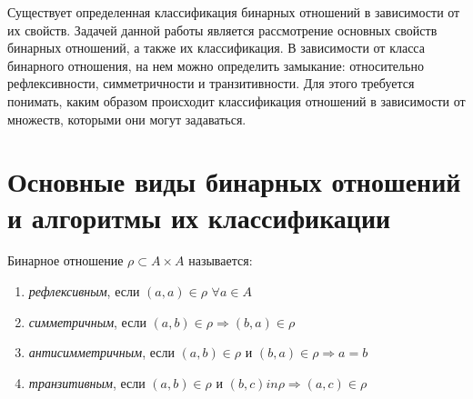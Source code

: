 \documentclass[bachelor, och, otchet]{SCWorks}
\begin{document}




\intro

Существует определенная классификация бинарных отношений в зависимости от их свойств. Задачей данной работы является рассмотрение 
основных свойств бинарных отношений, а также их классификация. В зависимости от класса бинарного отношения, на нем можно определить замыкание: относительно рефлексивности,
симметричности и транзитивности. Для этого требуется понимать, каким образом происходит классификация отношений в зависимости от множеств, которыми они могут задаваться.



\section{Основные виды бинарных отношений и алгоритмы их классификации}

Бинарное отношение $\rho \subset A \times A$ называется:

\begin{enumerate}
    \item \textit{рефлексивным}, если $(a,a) \in \rho$ $\forall a \in A$\
    
    \item \textit{симметричным}, если $(a,b) \in \rho \Rightarrow (b,a) \in \rho$
    
    \item \textit{антисимметричным}, если $(a,b) \in \rho$ и $(b,a) \in \rho \Rightarrow a = b$
    \item \textit{транзитивным}, если  $(a,b) \in \rho$ и $(b,c) in \rho \Rightarrow (a,c) \in \rho$ 
    
\end{enumerate}
\end{document}
